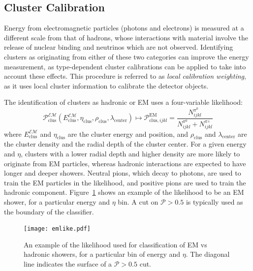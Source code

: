 \subsection{Cluster Calibration}

Energy from electromagnetic particles (photons and electrons) is measured at a different scale from that of hadrons, whose interactions with material involve the release of nuclear binding and neutrinos which are not observed. Identifying clusters as originating from either of these two categories can improve the energy measurement, as type-dependent cluster calibrations can be applied to take into account these effects. This procedure is referred to as \textit{local calibration weighting}, as it uses local cluster information to calibrate the detector objects.

The identification of clusters as hadronic or EM uses a four-variable likelihood:
%
\begin{equation}
\mathcal{P}_\mathrm{clus}^\mathcal{EM}(E_\mathrm{clus}^\mathcal{EM}, \eta_\mathrm{clus}, \rho_\mathrm{clus},\lambda_\mathrm{center} ) \mapsto \mathcal{P}^\mathrm{EM}_{\mathrm{clus},ijkl} = \frac{N_{ijkl}^{\pi^0}}{N_{ijkl}^{\pi^0} + N_{ijkl}^{\pi^\pm}}
\end{equation}
%
where $E_\mathrm{clus}^\mathcal{EM}$ and $\eta_\mathrm{clus}$ are the cluster energy and position, and $\rho_\mathrm{clus}$ and $\lambda_\mathrm{center}$ are the cluster density and the radial depth of the cluster center. For a given energy and $\eta$, clusters with a lower radial depth and higher density are more likely to originate from EM particles, whereas hadronic interactions are expected to have longer and deeper showers. Neutral pions, which decay to photons, are used to train the EM particles in the likelihood, and positive pions are used to train the hadronic component. Figure~\ref{fig:jet-reconstruction:cluster-calibration:em-like} shows an example of the likelihood to be an EM shower, for a particular energy and $\eta$ bin. A cut on $\mathcal{P} > 0.5$ is typically used as the boundary of the classifier.


\begin{figure}
\centering
\texttt{[image: emlike.pdf]}
\label{fig:jet-reconstruction:cluster-calibration:em-like}
\caption{An example of the likelihood used for classification of EM vs hadronic showers, for a particular bin of energy and $\eta$. The diagonal line indicates the surface of a $\mathcal{P} > 0.5$ cut.}
\end{figure}

